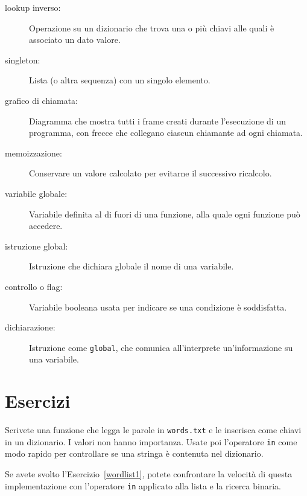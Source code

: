 \documentclass[10pt]{book}
\begin{document}
\begin{description}
\item[lookup inverso:] Operazione su un dizionario che trova una o più chiavi alle quali è associato un dato valore.

\item[singleton:] Lista (o altra sequenza) con un singolo elemento.

\item[grafico di chiamata:] Diagramma che mostra tutti i frame creati durante l'esecuzione di un programma, con frecce che collegano ciascun chiamante ad ogni chiamata.

\item[memoizzazione:] Conservare un valore calcolato per evitarne il successivo ricalcolo.

\item[variabile globale:]  Variabile definita al di fuori di una funzione, alla quale ogni funzione può accedere.

\item[istruzione global:]  Istruzione che dichiara globale il nome di una variabile.

\item[controllo o flag:] Variabile booleana usata per indicare se una condizione è soddisfatta.

\item[dichiarazione:] Istruzione come {\tt global}, che comunica all'interprete un'informazione su una variabile.

\end{description}

\section{Esercizi}


\begin{exercise}
\label{wordlist2}

Scrivete una funzione che legga le parole in {\tt words.txt} e le inserisca come chiavi in un dizionario. I valori non hanno importanza. Usate poi l'operatore {\tt in} come modo rapido per controllare se una stringa è contenuta nel dizionario.

Se avete svolto l'Esercizio~\ref{wordlist1}, potete confrontare la velocità di questa implementazione con l'operatore {\tt in} applicato alla lista e la ricerca binaria.

\end{exercise}
\end{document}
